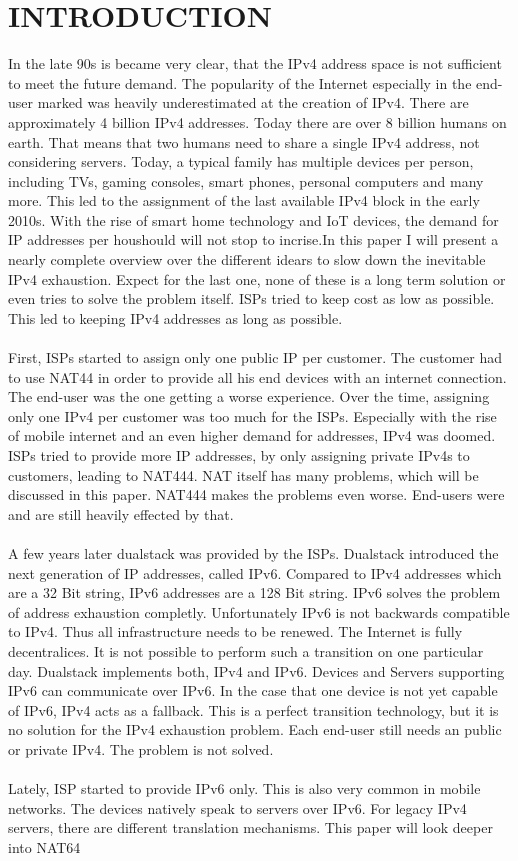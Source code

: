 \documentclass[format=sigconf, natbib=true, nonacm=true]{acmart}
\begin{document}
    \section{INTRODUCTION}
    In the late 90s is became very clear, that the IPv4 address space is not sufficient to meet the future demand. The popularity of the Internet especially in the end-user marked was heavily underestimated at the creation of IPv4. There are approximately 4 billion IPv4 addresses. Today there are over 8 billion humans on earth. That means that two humans need to share a single IPv4 address, not considering servers. Today, a typical family has multiple devices per person, including TVs, gaming consoles, smart phones, personal computers and many more. This led to the assignment of the last available IPv4 block in the early 2010s. With the rise of smart home technology and IoT devices, the demand for IP addresses per houshould will not stop to incrise.In this paper I will present a nearly complete overview over the different idears to slow down the inevitable IPv4 exhaustion. Expect for the last one, none of these is a long term solution or even tries to solve the problem itself. ISPs tried to keep cost as low as possible. This led to keeping IPv4 addresses as long as possible.\\\\First, ISPs started to assign only one public IP per customer. The customer had to use NAT44 in order to provide all his end devices with an internet connection. The end-user was the one getting a worse experience. Over the time, assigning only one IPv4 per customer was too much for the ISPs. Especially with the rise of mobile internet and an even higher demand for addresses, IPv4 was doomed. ISPs tried to provide more IP addresses, by only assigning private IPv4s to customers, leading to NAT444. NAT itself has many problems, which will be discussed in this paper. NAT444 makes the problems even worse. End-users were and are still heavily effected by that.\\\\A few years later dualstack was provided by the ISPs. Dualstack introduced the next generation of IP addresses, called IPv6. Compared to IPv4 addresses which are a 32 Bit string, IPv6 addresses are a 128 Bit string. IPv6 solves the problem of address exhaustion completly. Unfortunately IPv6 is not backwards compatible to IPv4. Thus all infrastructure needs to be renewed. The Internet is fully decentralices. It is not possible to perform such a transition on one particular day. Dualstack implements both, IPv4 and IPv6. Devices and Servers supporting IPv6 can communicate over IPv6. In the case that one device is not yet capable of IPv6, IPv4 acts as a fallback. This is a perfect transition technology, but it is no solution for the IPv4 exhaustion problem. Each end-user still needs an public or private IPv4. The problem is not solved.\\\\Lately, ISP started to provide IPv6 only. This is also very common in mobile networks. The devices natively speak to servers over IPv6. For legacy IPv4 servers, there are different translation mechanisms. This paper will look deeper into NAT64 
\end{document}
